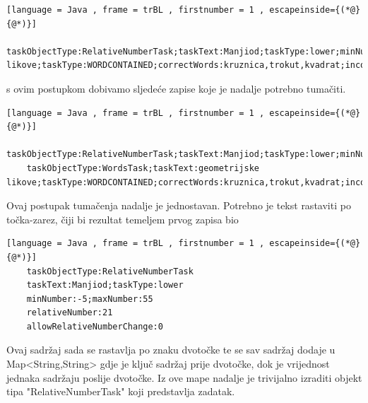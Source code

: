 \documentclass[times, utf8, zavrsni]{fer}
\begin{document}
	
	\begin{lstlisting}[language = Java , frame = trBL , firstnumber = 1 , escapeinside={(*@}{@*)}]
	taskObjectType:RelativeNumberTask;taskText:Manjiod;taskType:lower;minNumber:-5;maxNumber:55;relativeNumber:21;allowRelativeNumberChange:0\#DELIMITER\#taskObjectType:WordsTask;taskText:geometrijske likove;taskType:WORDCONTAINED;correctWords:kruznica,trokut,kvadrat;incorrectWords:piramida,valjak,sfera
	\end{lstlisting}
	s ovim postupkom dobivamo sljedeće zapise koje je nadalje potrebno tumačiti.
	\begin{lstlisting}[language = Java , frame = trBL , firstnumber = 1 , escapeinside={(*@}{@*)}]
	taskObjectType:RelativeNumberTask;taskText:Manjiod;taskType:lower;minNumber:-5;maxNumber:55;relativeNumber:21;allowRelativeNumberChange:0
	taskObjectType:WordsTask;taskText:geometrijske likove;taskType:WORDCONTAINED;correctWords:kruznica,trokut,kvadrat;incorrectWords:piramida,valjak,sfera
	\end{lstlisting}
	Ovaj postupak tumačenja nadalje je jednostavan. Potrebno je tekst rastaviti po točka-zarez, čiji bi rezultat temeljem prvog zapisa bio
	\begin{lstlisting}[language = Java , frame = trBL , firstnumber = 1 , escapeinside={(*@}{@*)}]
	taskObjectType:RelativeNumberTask
	taskText:Manjiod;taskType:lower
	minNumber:-5;maxNumber:55
	relativeNumber:21
	allowRelativeNumberChange:0
	\end{lstlisting}
	Ovaj sadržaj sada se rastavlja po znaku dvotočke te se sav sadržaj dodaje u Map<String,String> gdje je ključ sadržaj prije dvotočke, dok je vrijednost jednaka sadržaju poslije dvotočke.
	Iz ove mape nadalje je trivijalno izraditi objekt tipa "RelativeNumberTask" koji predstavlja zadatak. 
\end{document}
